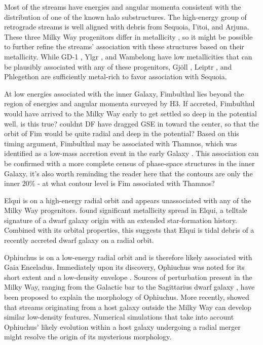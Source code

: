 \documentclass[twocolumn]{aastex63}
\newcommand{\feh}{\ensuremath{\textrm{[Fe/H]}}}
\begin{document}
Most of the streams have energies and angular momenta consistent with the distribution of one of the known halo substructures.
The high-energy group of retrograde streams is well aligned with debris from Sequoia, I'itoi, and Arjuna.
These three Milky Way progenitors differ in metallicity \citep{naidu2020}, so it might be possible to further refine the streams' association with these structures based on their metallicity.
While GD-1 \citep[spectroscopic $\feh=-2.3$,][]{bonaca2020b}, Ylgr \citep[spectroscopic $\feh=-1.9$,][]{ibata2019}, and  Wambelong \citep[isochrone $\feh=-2.2$,][]{shipp2018} have low metallicities that can be plausibly associated with any of these progenitors, Gj\" oll \citep[spectroscopic $\feh=-1.5$,][]{hansen2020}, Leiptr \citep[isochrone $\feh=-1.6$,][]{ibata2019}, and Phlegethon \citep[spectroscopic $\feh=-1.6$,][]{ibata2018} are sufficiently metal-rich to favor association with Sequoia.

At low energies associated with the inner Galaxy, Fimbulthul lies beyond the region of energies and angular momenta surveyed by H3.
If accreted, Fimbulthul would have arrived to the Milky Way early to get settled so deep in the potential well. {\color{red} is this true?  couldnt DF have dragged GSE in toward the center, so that the orbit of Fim would be quite radial and deep in the potential?}
Based on this timing argument, Fimbulthul may be associated with Thamnos, which was identified as a low-mass accretion event in the early Galaxy \citep{koppelman2019}.
This association can be confirmed with a more complete census of phase-space structures in the inner Galaxy.  {\color{red} it's also worth reminding the reader here that the contours are only the inner 20\% - at what contour level is Fim associated with Thamnos?}

Elqui is on a high-energy radial orbit and appears unassociated with any of the Milky Way progenitors.
\citet{ji2020} found significant metallicity spread in Elqui, a telltale signature of a dwarf galaxy origin with an extended star-formation history.
Combined with its orbital properties, this suggests that Elqui is tidal debris of a recently accreted dwarf galaxy on a radial orbit.

Ophiuchus is on a low-energy radial orbit and is therefore likely associated with Gaia Enceladus.
Immediately upon its discovery, Ophiuchus was noted for its short extent and a low-density envelope \citep{bernard2015, sesar2015}.
Sources of perturbation present in the Milky Way, ranging from the Galactic bar \citep{price-whelan2016} to the Sagittarius dwarf galaxy \citep{lane2020}, have been proposed to explain the morphology of Ophiuchus.
More recently, \citet{carlberg2019} showed that streams originating from a host galaxy outside the Milky Way can develop similar low-density features.
Numerical simulations that take into account Ophiuchus' likely evolution within a host galaxy undergoing a radial merger might resolve the origin of its mysterious morphology.
\end{document}
